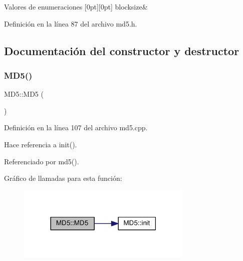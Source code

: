 \begin{DoxyEnumFields}{Valores de enumeraciones}
[0pt][0pt]{}\hypertarget{classMD5_a227e6f16f2409956b516b453e6bc7429a1cc0a742ca803f75a021aef77b522963}{}\label{classMD5_a227e6f16f2409956b516b453e6bc7429a1cc0a742ca803f75a021aef77b522963} 
blocksize&\\
\hline

\end{DoxyEnumFields}


Definición en la línea 87 del archivo md5.\+h.



\subsection{Documentación del constructor y destructor}
\hypertarget{classMD5_afa6155ec36de415ab2dcf5e54b670d13}{}\label{classMD5_afa6155ec36de415ab2dcf5e54b670d13} 
\subsubsection{\texorpdfstring{M\+D5()}{MD5()}\hspace{0.1cm}{\footnotesize\ttfamily [1/2]}}
{\footnotesize\ttfamily M\+D5\+::\+M\+D5 (\begin{DoxyParamCaption}{ }\end{DoxyParamCaption})}



Definición en la línea 107 del archivo md5.\+cpp.



Hace referencia a init().



Referenciado por md5().

Gráfico de llamadas para esta función\+:\nopagebreak
\begin{figure}[H]
\begin{center}
\leavevmode
\includegraphics[width=237pt]{classMD5_afa6155ec36de415ab2dcf5e54b670d13_cgraph}
\end{center}
\end{figure}
\hypertarget{classMD5_a155356ffd713345e69e6dcbd9f8da6ce}{}\label{classMD5_a155356ffd713345e69e6dcbd9f8da6ce} 
